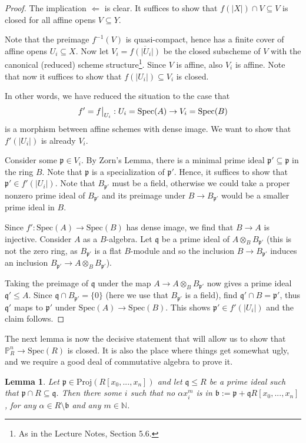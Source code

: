 \documentclass{scrartcl}
\newcommand{\N}{\mathbb{N}}
\renewcommand{\P}{\mathbb{P}}
\newcommand{\p}{\mathfrak{p}}
\newcommand{\q}{\mathfrak{q}}
\renewcommand{\b}{\mathfrak{b}}
\newcommand{\Spec}{\mathrm{Spec}}
\newcommand{\Proj}{\mathrm{Proj}}
\newcommand\restr[2]{{
    \left.\kern-\nulldelimiterspace
    #1
    \vphantom{\big|}
    \right|_{#2}
}}
\newtheorem{lemma}[subsection]{Lemma}
\theoremstyle{definition}
\begin{document}
\begin{proof}
    The implication $\Leftarrow$ is clear.
    It suffices to show that $f(|X|) \cap V \subseteq V$ is closed for all affine opens $V \subseteq Y$.
    
    Note that the preimage $f^{-1}(V)$ is quasi-compact, hence has a finite cover of affine opens $U_i \subseteq X$.
    Now let $V_i = \overline{f(|U_i|)}$ be the closed subscheme of $V$ with the canonical (reduced) scheme structure\footnote{As in the Lecture Notes, Section 5.6.}.
    Since $V$ is affine, also $V_i$ is affine.
    Note that now it suffices to show that $f(|U_i|) \subseteq V_i$ is closed.

    In other words, we have reduced the situation to the case that
    \begin{equation*}
        f' = \restr{f}{U_i}: U_i = \Spec(A) \to V_i = \Spec(B)
    \end{equation*}
    is a morphism between affine schemes with dense image.
    We want to show that $f'(|U_i|)$ is already $V_i$.

    Consider some $\p \in V_i$.
    By Zorn's Lemma, there is a minimal prime ideal $\p' \subseteq \p$ in the ring $B$.
    Note that $\p$ is a specialization of $\p'$.
    Hence, it suffices to show that $\p' \in f'(|U_i|)$.
    Note that $B_{\p'}$ must be a field, otherwise we could take a proper nonzero prime ideal of $B_{\p'}$ and its preimage under $B \to B_{\p'}$ would be a smaller prime ideal in $B$.

    Since $f': \Spec(A) \to \Spec(B)$ has dense image, we find that $B \to A$ is injective.
    Consider $A$ as a $B$-algebra.
    Let $\q$ be a prime ideal of $A \otimes_B B_{\p'}$ (this is not the zero ring, as $B_{\p'}$ is a flat $B$-module and so the inclusion $B \to B_{\p'}$ induces an inclusion $B_{\p'} \to A \otimes_B B_{\p'}$).

    Taking the preimage of $\q$ under the map $A \to A \otimes_B B_{\p'}$ now gives a prime ideal $\q' \leq A$.
    Since $\q \cap B_{\p'} = \{ 0 \}$ (here we use that $B_{\p'}$ is a field), find $\q' \cap B = \p'$, thus $\q'$ maps to $\p'$ under $\Spec(A) \to \Spec(B)$.
    This shows $\p' \in f'(|U_i|)$ and the claim follows.
\end{proof}
The next lemma is now the decisive statement that will allow us to show that $\P_R^n \to \Spec(R)$ is closed.
It is also the place where things get somewhat ugly, and we require a good deal of commutative algebra to prove it.
\begin{lemma}
    \label{prop:adding_coeff_ideal_does_not_introduce_irrelevant_ideal}
    Let $\p \in \Proj(R[x_0, ..., x_n])$ and let $\q \leq R$ be a prime ideal such that $\p \cap R \subseteq \q$.
    Then there some $i$ such that no $\alpha x_i^m$ is in $\b := \p + \q R[x_0, ..., x_n]$, for any $\alpha \in R \setminus \b$ and any $m \in \N$.
\end{lemma}
\end{document}
